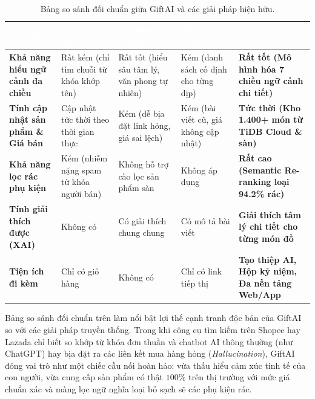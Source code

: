 \begin{table}[htbp]
\centering
\caption{Bảng so sánh đối chuẩn giữa GiftAI và các giải pháp hiện hữu.}
\label{tab:benchmarking}
\small
\renewcommand{\arraystretch}{1.25}
\begin{tabularx}{\textwidth}{|p{3.0cm}|p{2.6cm}|p{2.6cm}|p{2.6cm}|X|}
\hline
\rowcolor{PrimaryBlue}
\textcolor{white}{\textbf{Tiêu chí}} & 
\textcolor{white}{\textbf{Tìm kiếm sàn TMĐT}} & 
\textcolor{white}{\textbf{Chatbot AI chung}} & 
\textcolor{white}{\textbf{Website Blog tĩnh}} & 
\textcolor{white}{\textbf{Hệ thống GiftAI}} \\
\hline
\textbf{Khả năng hiểu ngữ cảnh đa chiều} & Rất kém (chỉ tìm chuỗi từ khóa khớp tên) & Rất tốt (hiểu sâu tâm lý, văn phong tự nhiên) & Kém (danh sách cố định cho từng dịp) & \textbf{Rất tốt (Mô hình hóa 7 chiều ngữ cảnh chi tiết)} \\
\hline
\textbf{Tính cập nhật sản phẩm \& Giá bán} & Cập nhật tức thời theo thời gian thực & Kém (dễ bịa đặt link hỏng, giá sai lệch) & Kém (bài viết cũ, giá không cập nhật) & \textbf{Tức thời (Kho 1.400+ món từ TiDB Cloud \& sàn)} \\
\hline
\textbf{Khả năng lọc rác phụ kiện} & Kém (nhiễm nặng spam từ khóa người bán) & Không hỗ trợ cào lọc sản phẩm sàn & Không áp dụng & \textbf{Rất cao (Semantic Re-ranking loại 94.2\% rác)} \\
\hline
\textbf{Tính giải thích được (XAI)} & Không có & Có giải thích chung chung & Có mô tả bài viết & \textbf{Giải thích tâm lý chi tiết cho từng món đồ} \\
\hline
\textbf{Tiện ích đi kèm} & Chỉ có giỏ hàng & Không có & Chỉ có link tiếp thị & \textbf{Tạo thiệp AI, Hộp kỷ niệm, Đa nền tảng Web/App} \\
\hline
\end{tabularx}
\end{table}

Bảng so sánh đối chuẩn trên làm nổi bật lợi thế cạnh tranh độc bản của GiftAI so với các giải pháp truyền thống. Trong khi công cụ tìm kiếm trên Shopee hay Lazada chỉ biết so khớp từ khóa đơn thuần và chatbot AI thông thường (như ChatGPT) hay bịa đặt ra các liên kết mua hàng hỏng (\textit{Hallucination}), GiftAI đóng vai trò như một chiếc cầu nối hoàn hảo: vừa thấu hiểu cảm xúc tinh tế của con người, vừa cung cấp sản phẩm có thật $100\%$ trên thị trường với mức giá chuẩn xác và màng lọc ngữ nghĩa loại bỏ sạch sẽ các phụ kiện rác.

